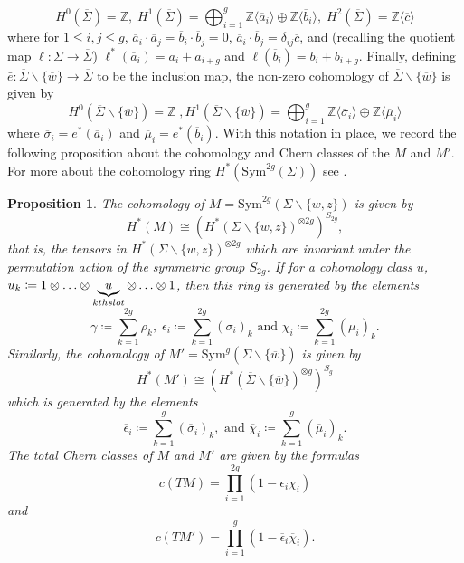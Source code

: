 \documentclass[11pt]{amsart}
\newtheorem{proposition}[theorem]{Proposition}
\theoremstyle{definition}
\theoremstyle{remark}
\def\Z{\mathbb{Z}}
\def\Sym{\mathrm{Sym}}
\numberwithin{equation}{section}
\begin{document}
\[H^0(\overline{\Sigma})=\Z,\; H^1(\overline{\Sigma})=\bigoplus_{i=1}^{g}\Z\langle \overline{a}_i\rangle\oplus \Z\langle \overline{b}_i\rangle,\; H^2(\overline{\Sigma})=\Z\langle \overline{c}\rangle\]
   where for $1\le i,j\le g$, $\overline{a}_i\cdot \overline{a}_j=\overline{b}_i\cdot \overline{b}_j=0$, $\overline{a}_i\cdot \overline{b}_j=\delta_{ij}\overline{c}$, and (recalling the quotient map $\ell\colon \Sigma\to \overline{\Sigma}$) $\ell^*(\overline{a}_i)=a_i+a_{i+g}$ and $\ell(\overline{b}_i)=b_i+b_{i+g}$. Finally, defining $\bar{e}\colon \overline{\Sigma}\backslash \{\overline{w}\}\to \overline{\Sigma}$ to be the inclusion map, the non-zero cohomology of $\overline{\Sigma}\backslash \{\overline{w}\}$ is given by
   \[H^0(\overline{\Sigma}\backslash \{\overline{w}\})=\Z\;, H^1( \overline{\Sigma}\backslash \{\overline{w}\})=\bigoplus_{i=1}^{g}\Z\langle \overline{\sigma}_i\rangle\oplus \Z\langle \overline{\mu}_i\rangle\]
   where $\overline{\sigma}_i=e^*(\overline{a}_i)$ and $\overline{\mu}_i=e^*(\overline{b}_i)$.
 With this notation in place, we record the following proposition about the cohomology and Chern classes of the $M$ and $M'$. For more about the cohomology ring $H^*(\Sym^{2g}(\Sigma))$ see \cite{Mac}.
\begin{proposition}
    The cohomology of $M=\Sym^{2g}(\Sigma\backslash \{w,z\})$ is given by \[H^*(M)\cong (H^*(\Sigma\backslash \{w,z\})^{\otimes 2g})^{S_{2g}},\] that is, the tensors in $H^*(\Sigma\backslash \{w,z\})^{\otimes 2g}$ which are invariant under the permutation action of the symmetric group $S_{2g}$. If for a cohomology class $u$, $u_k\coloneq 1\otimes\hdots\otimes \underbrace{u}_{\textup{kth slot}}\otimes\hdots\otimes 1$, then this ring is generated by the elements 
    \[\gamma\coloneq \sum_{k=1}^{2g}\rho_k,\;\epsilon_i\coloneq \sum_{k=1}^{2g}(\sigma_i)_k\textrm{ and } \chi_i\coloneq \sum_{k=1}^{2g}(\mu_i)_k.\]
    Similarly, the cohomology of $M'=\Sym^g(\overline{\Sigma}\backslash \{\overline{w}\})$ is given by \[H^*(M')\cong (H^*(\overline{\Sigma}\backslash\{\overline{w}\})^{\otimes g})^{S_g}\]which is generated by the elements 
     \[\overline{\epsilon}_i\coloneq \sum_{k=1}^{g}(\overline{\sigma}_i)_k,\textrm{ and }\overline{\chi}_i\coloneq \sum_{k=1}^{g}(\overline{\mu}_i)_k.\]
    The total Chern classes of $M$ and $M'$ are given by the formulas 
    \begin{equation}\label{chernclassM}
    c(TM)=\prod_{i=1}^{2g}(1-\epsilon_i\chi_i)\end{equation}and \begin{equation}\label{chernclassM'}c(TM')=\prod_{i=1}^g(1-\overline{\epsilon}_i\overline{\chi}_i).\end{equation}
\end{proposition}
\end{document}
